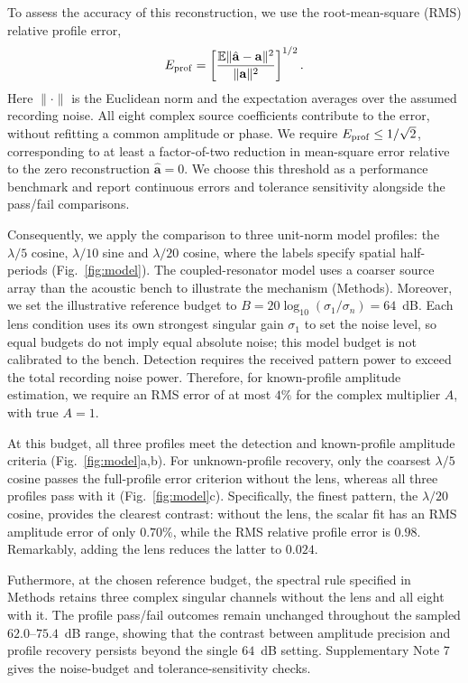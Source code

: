 \documentclass[lineno,pdflatex,sn-nature]{sn-jnl}%
\theoremstyle{thmstyleone}%
\theoremstyle{thmstyletwo}%
\theoremstyle{thmstylethree}%
\begin{document}
To assess the accuracy of this reconstruction, we use the root-mean-square (RMS) relative profile error,
\begin{equation}
 E_{\rm prof}=\left[\frac{\mathbb E\|\hat{\mathbf a}-\mathbf a\|^2}{\|\mathbf a\|^2}\right]^{1/2}.
 \label{eq:profile_rms}
\end{equation}
Here $\|\cdot\|$ is the Euclidean norm and the expectation averages over the assumed recording noise. All eight complex source coefficients contribute to the error, without refitting a common amplitude or phase. We require $E_{\rm prof}\le1/\sqrt2$, corresponding to at least a factor-of-two reduction in mean-square error relative to the zero reconstruction $\hat{\mathbf a}=0$. We choose this threshold as a performance benchmark and report continuous errors and tolerance sensitivity alongside the pass/fail comparisons.

Consequently, we apply the comparison to three unit-norm model profiles: the $\lambda/5$ cosine, $\lambda/10$ sine and $\lambda/20$ cosine, where the labels specify spatial half-periods (Fig.~\ref{fig:model}). The coupled-resonator model uses a coarser source array than the acoustic bench to illustrate the mechanism (Methods). Moreover, we set the illustrative reference budget to $B=20\log_{10}(\sigma_1/\sigma_n)=64$~dB. Each lens condition uses its own strongest singular gain $\sigma_1$ to set the noise level, so equal budgets do not imply equal absolute noise; this model budget is not calibrated to the bench. Detection requires the received pattern power to exceed the total recording noise power. Therefore, for known-profile amplitude estimation, we require an RMS error of at most $4\%$ for the complex multiplier $A$, with true $A=1$.

At this budget, all three profiles meet the detection and known-profile amplitude criteria (Fig.~\ref{fig:model}a,b). For unknown-profile recovery, only the coarsest $\lambda/5$ cosine passes the full-profile error criterion without the lens, whereas all three profiles pass with it (Fig.~\ref{fig:model}c). Specifically, the finest pattern, the $\lambda/20$ cosine, provides the clearest contrast: without the lens, the scalar fit has an RMS amplitude error of only $0.70\%$, while the RMS relative profile error is $0.98$. Remarkably, adding the lens reduces the latter to $0.024$.

Futhermore, at the chosen reference budget, the spectral rule specified in Methods retains three complex singular channels without the lens and all eight with it. The profile pass/fail outcomes remain unchanged throughout the sampled $62.0$--$75.4$~dB range, showing that the contrast between amplitude precision and profile recovery persists beyond the single $64$~dB setting. Supplementary Note 7 gives the noise-budget and tolerance-sensitivity checks.
\end{document}
